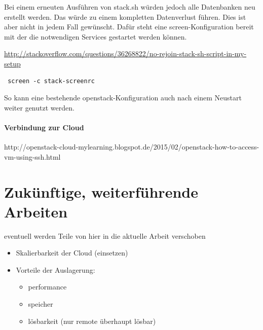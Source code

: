 \documentclass[a4paper,10pt]{article}
\begin{document}
Bei einem erneuten Ausführen von stack.sh würden jedoch alle Datenbanken neu erstellt werden.
Das würde zu einem kompletten Datenverlust führen.
Dies ist aber nicht in jedem Fall gewünscht.
Dafür steht eine screen-Konfiguration bereit mit der die notwendigen Services gestartet werden können.

\url{http://stackoverflow.com/questions/36268822/no-rejoin-stack-sh-script-in-my-setup}

\begin{verbatim}
 screen -c stack-screenrc
\end{verbatim}

So kann eine bestehende openstack-Konfiguration auch nach einem Neustart weiter genutzt werden.

\paragraph{Verbindung zur Cloud}

http://openstack-cloud-mylearning.blogspot.de/2015/02/openstack-how-to-access-vm-using-ssh.html

\newpage

\section{Zukünftige, weiterführende Arbeiten}

eventuell werden Teile von hier in die aktuelle Arbeit verschoben

\begin{itemize}
 \item Skalierbarkeit der Cloud (einsetzen)
 \item Vorteile der Auslagerung:
  \begin{itemize}
    \item performance
    \item speicher
    \item lösbarkeit (nur remote überhaupt lösbar)
  \end{itemize}

\end{itemize}
\end{document}
